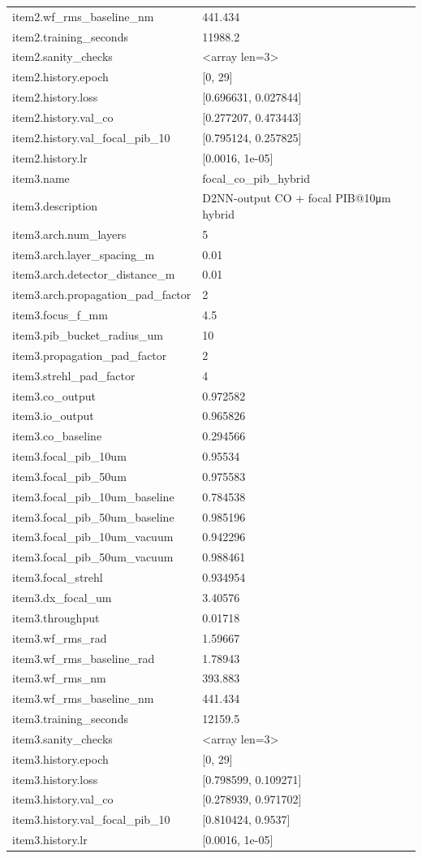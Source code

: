 \begin{longtable}{p{}p{}}
item2.wf\_rms\_baseline\_nm & 441.434\\
item2.training\_seconds & 11988.2\\
item2.sanity\_checks & <array len=3>\\
item2.history.epoch & [0, 29]\\
item2.history.loss & [0.696631, 0.027844]\\
item2.history.val\_co & [0.277207, 0.473443]\\
item2.history.val\_focal\_pib\_10 & [0.795124, 0.257825]\\
item2.history.lr & [0.0016, 1e-05]\\
item3.name & focal\_co\_pib\_hybrid\\
item3.description & D2NN-output CO + focal PIB@10μm hybrid\\
item3.arch.num\_layers & 5\\
item3.arch.layer\_spacing\_m & 0.01\\
item3.arch.detector\_distance\_m & 0.01\\
item3.arch.propagation\_pad\_factor & 2\\
item3.focus\_f\_mm & 4.5\\
item3.pib\_bucket\_radius\_um & 10\\
item3.propagation\_pad\_factor & 2\\
item3.strehl\_pad\_factor & 4\\
item3.co\_output & 0.972582\\
item3.io\_output & 0.965826\\
item3.co\_baseline & 0.294566\\
item3.focal\_pib\_10um & 0.95534\\
item3.focal\_pib\_50um & 0.975583\\
item3.focal\_pib\_10um\_baseline & 0.784538\\
item3.focal\_pib\_50um\_baseline & 0.985196\\
item3.focal\_pib\_10um\_vacuum & 0.942296\\
item3.focal\_pib\_50um\_vacuum & 0.988461\\
item3.focal\_strehl & 0.934954\\
item3.dx\_focal\_um & 3.40576\\
item3.throughput & 0.01718\\
item3.wf\_rms\_rad & 1.59667\\
item3.wf\_rms\_baseline\_rad & 1.78943\\
item3.wf\_rms\_nm & 393.883\\
item3.wf\_rms\_baseline\_nm & 441.434\\
item3.training\_seconds & 12159.5\\
item3.sanity\_checks & <array len=3>\\
item3.history.epoch & [0, 29]\\
item3.history.loss & [0.798599, 0.109271]\\
item3.history.val\_co & [0.278939, 0.971702]\\
item3.history.val\_focal\_pib\_10 & [0.810424, 0.9537]\\
item3.history.lr & [0.0016, 1e-05]\\
\end{longtable}

